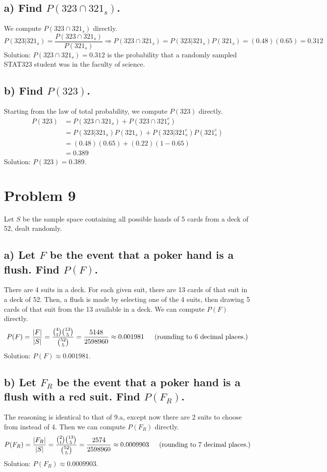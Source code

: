 \documentclass[11pt, letterpaper]{article}
\begin{document}
\subsection*{a) \normalfont Find $P(323 \cap 321_s)$.}
We compute $P(323 \cap 321_s)$ directly.
\[P(323|321_s)=\frac{P(323\cap 321_s)}{P(321_s)}\Rightarrow P(323 \cap 321_s)=P(323|321_s)P(321_s)=(0.48)(0.65)=0.312\]
Solution: $P(323\cap 321_s)=0.312$ is the probability that a randomly sampled STAT323 student was
in the faculty of science.

\subsection*{b) \normalfont Find $P(323)$.}
Starting from the law of total probability, we compute $P(323)$ directly.
\begin{align*}
    P(323)&=P(323\cap 321_s) + P(323\cap 321_s^c)\\
    &=P(323|321_s)P(321_s) + P(323|321_s^c)P(321_s^c)\\
    &=(0.48)(0.65)+(0.22)(1-0.65)\\
    &=0.389
\end{align*}
Solution: $P(323)=0.389$.

\section*{Problem 9}
Let $S$ be the sample space containing all possible hands of 5 cards from a deck of 52, dealt randomly.

\subsection*{a) \normalfont Let $F$ be the event that a poker hand is a flush. Find $P(F)$.}
There are 4 suits in a deck. For each given suit, there are 13 cards of that suit in a deck of 52. Then,
a flush is made by selecting one of the 4 suits, then drawing 5 cards of that suit from the 13 available in a deck. 
We can compute $P(F)$ directly. 
\[P(F)=\frac{|F|}{|S|}=\frac{{4\choose 1}{13\choose 5}}{{52\choose 5}}=\frac{5148}{2598960}\approx 0.001981 \text{\indent (rounding to 6 decimal places.)}\]
Solution: $P(F)\approx 0.001981$.

\subsection*{b) \normalfont Let $F_R$ be the event that a poker hand is a flush with a red suit. Find $P(F_R)$.}
The reasoning is identical to that of 9.a, except now there are 2 suits to choose from instead of 4. 
Then we can compute $P(F_R)$ directly. 
\[P(F_R)=\frac{|F_R|}{|S|}=\frac{{2\choose 1}{13\choose 5}}{{52\choose 5}}=\frac{2574}{2598960}\approx 0.0009903 \text{\indent (rounding to 7 decimal places.)}\]
Solution: $P(F_R)\approx 0.0009903$. 
\end{document}
